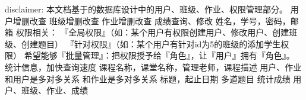 \markdownRendererInterblockSeparator
{}disclaimer: 本文档基于的数据库设计中的用户、班级、作业、权限管理部分。\markdownRendererInterblockSeparator
{}\markdownRendererInterblockSeparator
{}\markdownRendererUlBeginTight
\markdownRendererUlItem 用户增删改查\markdownRendererUlItemEnd 
\markdownRendererUlItem 班级增删改查\markdownRendererUlItemEnd 
\markdownRendererUlItem 作业增删改查\markdownRendererUlItemEnd 
\markdownRendererUlItem 成绩查询、修改\markdownRendererUlItemEnd 
\markdownRendererUlEndTight \markdownRendererInterblockSeparator
{}\markdownRendererInterblockSeparator
{}\markdownRendererUlBeginTight
\markdownRendererUlItem 姓名，学号，密码，邮箱\markdownRendererUlItemEnd 
\markdownRendererUlItem 权限相关：\markdownRendererInterblockSeparator
{}\markdownRendererUlBeginTight
\markdownRendererUlItem 『全局权限』（如：某个用户有权限创建用户、修改用户、创建班级、创建题目）\markdownRendererUlItemEnd 
\markdownRendererUlItem 『针对权限』（如：某个用户有针对id为5的班级的添加学生权限）\markdownRendererUlItemEnd 
\markdownRendererUlItem 希望能够『批量管理』：把权限授予给『角色』，让『用户』拥有『角色』。\markdownRendererUlItemEnd 
\markdownRendererUlEndTight \markdownRendererUlItemEnd 
\markdownRendererUlItem 统计信息，加快查询速度\markdownRendererUlItemEnd 
\markdownRendererUlEndTight \markdownRendererInterblockSeparator
{}\markdownRendererInterblockSeparator
{}\markdownRendererUlBeginTight
\markdownRendererUlItem 课程名称，课堂名称，管理老师，课程描述\markdownRendererUlItemEnd 
\markdownRendererUlItem 用户、作业\markdownRendererInterblockSeparator
{}\markdownRendererUlBeginTight
\markdownRendererUlItem 和用户是多对多关系\markdownRendererUlItemEnd 
\markdownRendererUlItem 和作业是多对多关系\markdownRendererUlItemEnd 
\markdownRendererUlEndTight \markdownRendererUlItemEnd 
\markdownRendererUlEndTight \markdownRendererInterblockSeparator
{}\markdownRendererInterblockSeparator
{}\markdownRendererUlBeginTight
\markdownRendererUlItem 标题，起止日期\markdownRendererUlItemEnd 
\markdownRendererUlItem 多道题目\markdownRendererUlItemEnd 
\markdownRendererUlItem 统计成绩\markdownRendererUlItemEnd 
\markdownRendererUlEndTight \markdownRendererInterblockSeparator
{}\markdownRendererInterblockSeparator
{}\markdownRendererUlBegin
\markdownRendererUlItem 用户、班级、作业、成绩\markdownRendererUlItemEnd 
